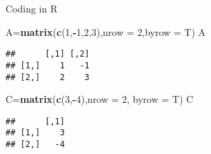 \documentclass[ignorenonframetext,]{beamer}
\newenvironment{Shaded}{\begin{snugshade}}{\end{snugshade}}
\newcommand{\KeywordTok}[1]{\textcolor[rgb]{0.13,0.29,0.53}{\textbf{#1}}}
\newcommand{\DataTypeTok}[1]{\textcolor[rgb]{0.13,0.29,0.53}{#1}}
\newcommand{\DecValTok}[1]{\textcolor[rgb]{0.00,0.00,0.81}{#1}}
\newcommand{\OperatorTok}[1]{\textcolor[rgb]{0.81,0.36,0.00}{\textbf{#1}}}
\newcommand{\NormalTok}[1]{#1}
\begin{document}
\begin{frame}[fragile]{Coding in R}

\begin{Shaded}
\begin{Highlighting}[]
\NormalTok{A=}\KeywordTok{matrix}\NormalTok{(}\KeywordTok{c}\NormalTok{(}\DecValTok{1}\NormalTok{,}\OperatorTok{-}\DecValTok{1}\NormalTok{,}\DecValTok{2}\NormalTok{,}\DecValTok{3}\NormalTok{),}\DataTypeTok{nrow =} \DecValTok{2}\NormalTok{,}\DataTypeTok{byrow =}\NormalTok{ T)}
\NormalTok{A}
\end{Highlighting}
\end{Shaded}

\begin{verbatim}
##      [,1] [,2]
## [1,]    1   -1
## [2,]    2    3
\end{verbatim}

\begin{Shaded}
\begin{Highlighting}[]
\NormalTok{C=}\KeywordTok{matrix}\NormalTok{(}\KeywordTok{c}\NormalTok{(}\DecValTok{3}\NormalTok{,}\OperatorTok{-}\DecValTok{4}\NormalTok{),}\DataTypeTok{nrow =} \DecValTok{2}\NormalTok{, }\DataTypeTok{byrow =}\NormalTok{ T)}
\NormalTok{C}
\end{Highlighting}
\end{Shaded}

\begin{verbatim}
##      [,1]
## [1,]    3
## [2,]   -4
\end{verbatim}

\end{frame}
\end{document}
